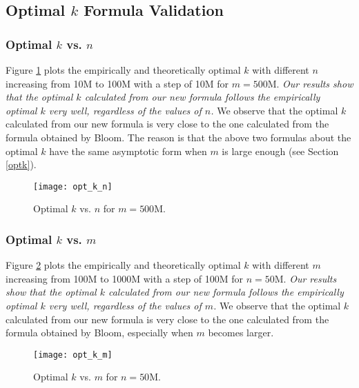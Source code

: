 \subsection{Optimal $k$ Formula Validation}

\subsubsection{Optimal $k$ vs. $n$}
Figure \ref{opt_k_n} plots the empirically and theoretically optimal $k$ with different $n$ increasing from 10M to 100M with a step of 10M for $m = 500$M. 
\textit{Our results show that the optimal $k$ calculated from our new formula follows the empirically optimal $k$ very well, regardless of the values of $n$.} 
We observe that the optimal $k$ calculated from our new formula is very close to the one calculated from the formula obtained by Bloom. 
The reason is that the above two formulas about the optimal $k$ have the same asymptotic form when $m$ is large enough (see Section \ref{optk}). 


\begin{figure}[t]
	\centering
	\prefig
	\texttt{[image: opt\_k\_n]}
	\postfig
	\precaption\adjustfigs
	\caption{Optimal $k$ vs. $n$ for $m = 500$M.}
	\postcaption
	\label{opt_k_n}
	\vspace{0.05in}
\end{figure}


\subsubsection{Optimal $k$ vs. $m$}

Figure \ref{opt_k_m} plots the empirically and theoretically optimal $k$ with different $m$ increasing from 100M to 1000M with a step of 100M for $n = 50$M. 
\textit{Our results show that the optimal $k$ calculated from our new formula follows the empirically optimal $k$ very well, regardless of the values of $m$.} 
We observe that the optimal $k$ calculated from our new formula is very close to the one calculated from the formula obtained by Bloom, especially when $m$ becomes larger. 

\begin{figure}[t]
	\centering
	\prefig
	\texttt{[image: opt\_k\_m]}
	\postfig \precaption
	\adjustfigs
	\caption{Optimal $k$ vs. $m$ for $n = 50$M.}
	\label{opt_k_m}
	\postcaption
\end{figure}



